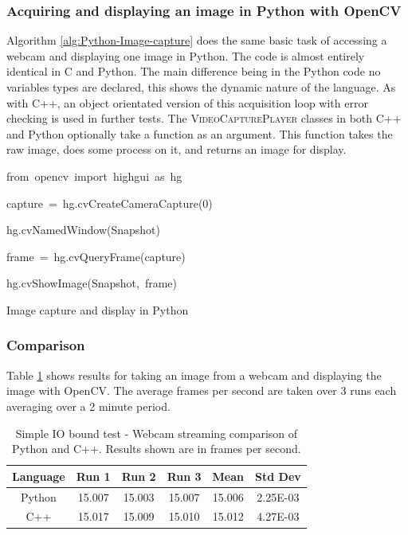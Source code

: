 \documentclass[english]{IEEEtran}
\newcommand{\noun}[1]{\textsc{#1}}
\providecommand{\tabularnewline}{\\}
\theoremstyle{plain}
\newenvironment{lyxcode}
{\par\begin{list}{}{
\setlength{\rightmargin}{\leftmargin}
\setlength{\listparindent}{0pt}%
\raggedright
\setlength{\itemsep}{0pt}
\setlength{\parsep}{0pt}
\normalfont\ttfamily}%
 \item[]}
{\end{list}}
\begin{document}
\subsubsection{Acquiring and displaying an image in Python with OpenCV}

Algorithm \ref{alg:Python-Image-capture} does the same basic task
of accessing a webcam and displaying one image in Python. The code
is almost entirely identical in C and Python. The main difference
being in the Python code no variables types are declared, this shows
the dynamic nature of the language. As with C++, an object orientated
version of this acquisition loop with error checking is used in further
tests. The \noun{VideoCapturePlayer} classes in both C++ and Python
optionally take a function as an argument. This function takes the
raw image, does some process on it, and returns an image for display. 

%
\begin{algorithm}[h]
\begin{lyxcode}
from~opencv~import~highgui~as~hg

capture~=~hg.cvCreateCameraCapture(0)

hg.cvNamedWindow(\textquotedbl{}Snapshot\textquotedbl{})

frame~=~hg.cvQueryFrame(capture)

hg.cvShowImage(\textquotedbl{}Snapshot\textquotedbl{},~frame)
\end{lyxcode}
\caption{\label{alg:Python-Image-capture}Image capture and display in Python}

\end{algorithm}



\subsubsection{Comparison}

Table \ref{tab:IO-bound-Webcam} shows results for taking an image
from a webcam and displaying the image with OpenCV. The average frames
per second are taken over 3 runs each averaging over a 2 minute period.

%
\begin{table}
\caption{\label{tab:IO-bound-Webcam}Simple IO bound test - Webcam streaming
comparison of Python and C++. Results shown are in frames per second.}


\begin{centering}
\begin{tabular}{|c|c|c|c|c|c|}
\hline 
Language & Run 1 & Run 2 & Run 3 & Mean & Std Dev\tabularnewline
\hline
\hline 
Python & 15.007 & 15.003 & 15.007 & 15.006  & 2.25E-03 \tabularnewline
\hline 
C++ & 15.017 & 15.009 & 15.010 & 15.012  & 4.27E-03 \tabularnewline
\hline
\end{tabular}
\par\end{centering}


\end{table}
\end{document}
